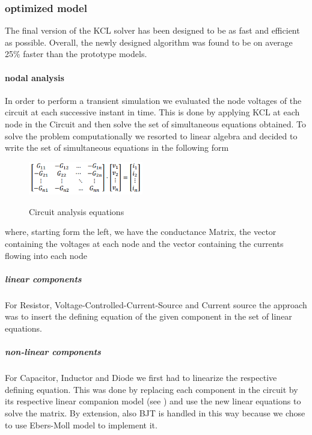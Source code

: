 \documentclass{article}
\begin{document}
\subsubsection{optimized model}
The final version of the KCL solver has been designed to be as fast and efficient as possible. Overall, the newly designed algorithm was found to be on average 25\% faster than the prototype models.
\paragraph{nodal analysis}
In order to perform a transient simulation we evaluated the node voltages of the circuit at each successive instant in time. This is done by applying KCL at each node in the Circuit and then solve the set of simultaneous equations obtained.\bigbreak
To solve the problem computationally we resorted to linear algebra and decided to write the set of simultaneous equations in the following form
\begin{figure}[h]
    \caption{Circuit analysis equations}
    \centering
    \includegraphics[width=5cm]{images/Conductance_Matrix.PNG}
    \label{fig:ConductanceMat}
\end{figure}

where, starting form the left, we have the conductance Matrix, the vector containing the voltages at each node and the vector containing the currents flowing into each node
\subparagraph{linear components}
For Resistor, Voltage-Controlled-Current-Source and Current source the approach was to insert the defining equation of the given component in the set of linear equations. 
\subparagraph{non-linear components}
For Capacitor, Inductor and Diode we first had to linearize the respective defining equation.
This was done by replacing each component in the circuit by its respective linear companion model (see \cite{LinearCompanionModels}) and use the new linear equations to solve the matrix. By extension, also BJT is handled in this way because we chose to use Ebers-Moll model to implement it.\bigbreak
\end{document}
